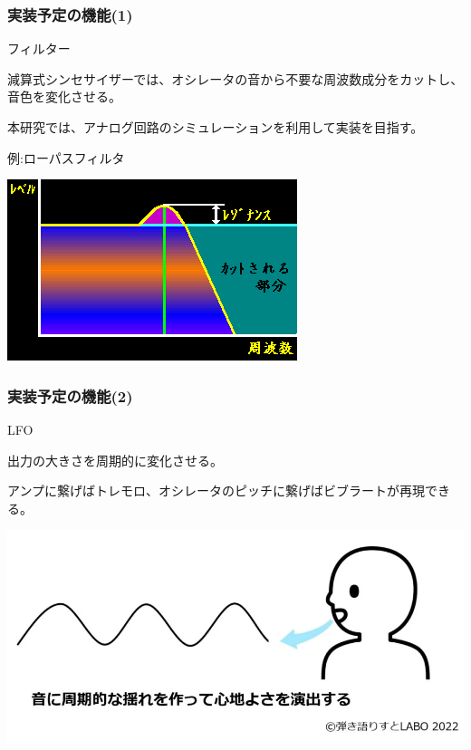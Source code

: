 \documentclass[dvipdfmx]{beamer} %
\begin{document}
\begin{frame}
  \frametitle{実装予定の機能(1)}
  \alert{フィルター}\par
  減算式シンセサイザーでは、オシレータの音から不要な周波数成分をカットし、音色を変化させる。\par
  本研究では、アナログ回路のシミュレーションを利用して実装を目指す。\par
  例:ローパスフィルタ\par
  \includegraphics[scale=0.5]{lpf.png}\par
\end{frame}

\begin{frame}
  \frametitle{実装予定の機能(2)}
  \alert{LFO}\par
  出力の大きさを周期的に変化させる。\par
  アンプに繋げばトレモロ、オシレータのピッチに繋げばビブラートが再現できる。\par
  \includegraphics[scale=0.25]{vib.png}\par
\end{frame}
\end{document}
